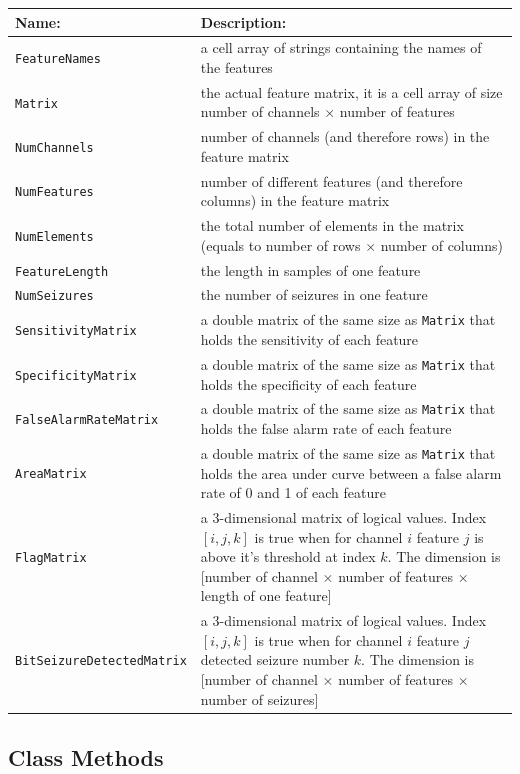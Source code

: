 \documentclass[usletter, 11pt]{extarticle}
\begin{document}
\begin{center}
	\begin{longtable}{p{5cm}|p{12cm}}
	\textbf{Name:} & \textbf{Description:} \\ \hline
	\texttt{FeatureNames} & a cell array of strings containing the names of the features \\
	\texttt{Matrix} & the actual feature matrix, it is a cell array of size number of channels $\times$ number of features \\
	\texttt{NumChannels} & number of channels (and therefore rows) in the feature matrix \\
	\texttt{NumFeatures} & number of different features (and therefore columns) in the feature matrix \\
	\texttt{NumElements} & the total number of elements in the matrix (equals to number of rows $\times$ number of columns) \\
	\texttt{FeatureLength} & the length in samples of one feature \\
	\texttt{NumSeizures} & the number of seizures in one feature \\
	\texttt{SensitivityMatrix} & a double matrix of the same size as \verb|Matrix| that holds the sensitivity of each feature \\
	\texttt{SpecificityMatrix} & a double matrix of the same size as \verb|Matrix| that holds the specificity of each feature \\
	\texttt{FalseAlarmRateMatrix} & a double matrix of the same size as \verb|Matrix| that holds the false alarm rate of each feature \\
	\texttt{AreaMatrix} & a double matrix of the same size as \verb|Matrix| that holds the area under curve between a false alarm rate of 0 and 1 of each feature \\
	\texttt{FlagMatrix} & a 3-dimensional matrix of logical values. Index $[i, j, k]$ is true when for channel $i$ feature $j$ is above it's threshold at index $k$. The dimension is [number of channel $\times$ number of features $\times$ length of one feature] \\
	\texttt{BitSeizureDetectedMatrix} & a 3-dimensional matrix of logical values. Index $[i, j, k]$ is true when for channel $i$ feature $j$ detected seizure number $k$. The dimension is [number of channel $\times$ number of features $\times$ number of seizures]
	\end{longtable} 
\end{center}

\subsection{Class Methods}
\end{document}

